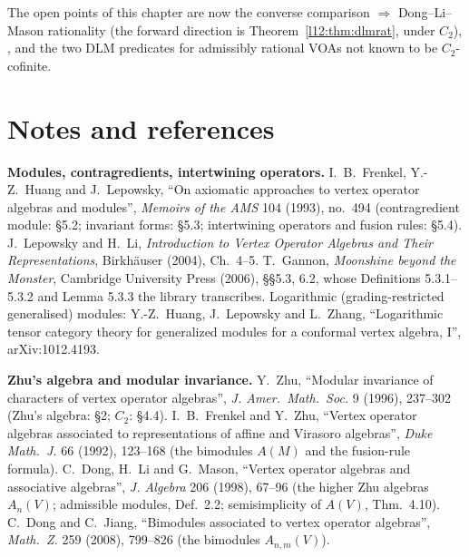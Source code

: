 The open points of this chapter are now the converse comparison  $\Rightarrow$ Dong--Li--Mason
rationality (the forward direction is Theorem~\ref{l12:thm:dlmrat}, under $C_2$),
, and the two DLM predicates for admissibly rational VOAs not known to be $C_2$-cofinite.

\section{Notes and references}\label{l12:sec:notes}

\textbf{Modules, contragredients, intertwining operators.} I.~B.~Frenkel, Y.-Z.~Huang and J.~Lepowsky, ``On axiomatic
approaches to vertex operator algebras and modules'', \emph{Memoirs of the AMS} 104 (1993), no.~494 (contragredient module:
§5.2; invariant forms: §5.3; intertwining operators and fusion rules: §5.4). J.~Lepowsky and H.~Li, \emph{Introduction to
Vertex Operator Algebras and Their Representations}, Birkh\"auser (2004), Ch.~4--5. T.~Gannon, \emph{Moonshine beyond the
Monster}, Cambridge University Press (2006), §§5.3, 6.2, whose Definitions 5.3.1--5.3.2 and Lemma 5.3.3 the library
transcribes. Logarithmic (grading-restricted generalised) modules: Y.-Z.~Huang, J.~Lepowsky and L.~Zhang, ``Logarithmic
tensor category theory for generalized modules for a conformal vertex algebra, I'', arXiv:1012.4193.

\textbf{Zhu's algebra and modular invariance.} Y.~Zhu, ``Modular invariance of characters of vertex operator algebras'',
\emph{J. Amer.\ Math.\ Soc.} 9 (1996), 237--302 (Zhu's algebra: §2; $C_2$: §4.4). I.~B.~Frenkel and Y.~Zhu, ``Vertex
operator algebras associated to representations of affine and Virasoro algebras'', \emph{Duke Math.\ J.} 66 (1992),
123--168 (the bimodules $A(M)$ and the fusion-rule formula). C.~Dong, H.~Li and G.~Mason, ``Vertex operator algebras and
associative algebras'', \emph{J. Algebra} 206 (1998), 67--96 (the higher Zhu algebras $A_n(V)$; admissible modules,
Def.~2.2; semisimplicity of $A(V)$, Thm.~4.10). C.~Dong and C.~Jiang, ``Bimodules associated to vertex operator algebras'',
\emph{Math.\ Z.} 259 (2008), 799--826 (the bimodules $A_{n,m}(V)$).

